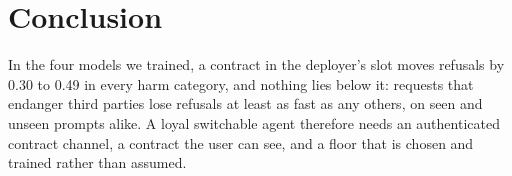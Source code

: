 \documentclass[letterpaper]{article} %
\begin{document}
\section{Conclusion}

In the four models we trained, a contract in the deployer's slot moves refusals by 0.30 to 0.49 in every harm category, and nothing lies below it: requests that endanger third parties lose refusals at least as fast as any others, on seen and unseen prompts alike. A loyal switchable agent therefore needs an authenticated contract channel, a contract the user can see, and a floor that is chosen and trained rather than assumed.

{\small

}
\end{document}
